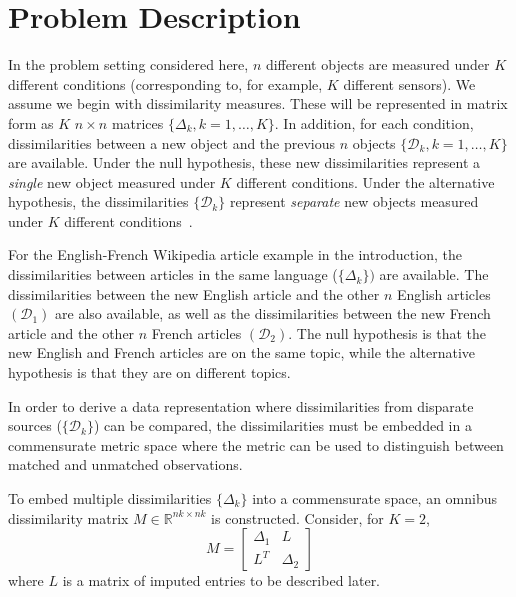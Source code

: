 \documentclass[12pt]{article} %
\begin{document}
\section{Problem Description}
In the problem setting considered here,  $n$ different objects are measured under $K$ different conditions (corresponding  to, for example, $K$ different sensors). We assume we begin with dissimilarity measures. These will be represented in matrix form as $K$ $n \times n$ matrices $\{\Delta_k,k=1 ,\ldots,K\}$.  In addition, for each condition, dissimilarities between  a new object  and the previous 
$n$ objects $\{\mathcal{D}_k,k=1 ,\ldots,K\}$ are available. Under  the null hypothesis, these new dissimilarities represent a \emph{single} new object   measured under $K$ different conditions. Under the alternative hypothesis, the dissimilarities $\{\mathcal{D}_k\}$ represent \emph{separate} new objects   measured under $K$ different conditions~\cite{JOFC}. %

For the English-French Wikipedia  article example in the introduction,  the dissimilarities between articles in the same language  ($\{\Delta_k\})$ are available. The dissimilarities between the new English article and the  other $n$ English articles $(\mathcal{D}_1)$ are also available, as well as the dissimilarities between the new French article  and the other $n$ French articles $(\mathcal{D}_2)$. The null hypothesis is that the new English and French articles are on the same topic, while the alternative hypothesis is that they are on different topics.

  In order to derive a data representation where dissimilarities from disparate sources ($\{\mathcal{D}_k\}$)  can be compared, the dissimilarities must be embedded in a commensurate metric space where the metric can be used to distinguish between matched and unmatched observations.


To embed multiple dissimilarities  $\{\Delta_k\}$  into a commensurate space, an omnibus dissimilarity matrix  $M \in \mathbb{R}^{nk \times nk}$  is constructed. Consider, for $K=2$,
 \begin{equation}
M=  \left[ \begin{array}{cc}
         \Delta_1 & L\\
        L^T  & \Delta_2 
     \end{array}  \right]     \label{omnibus} 
\end{equation} where $L$ is a matrix of imputed entries to be described later. 
\end{document}
